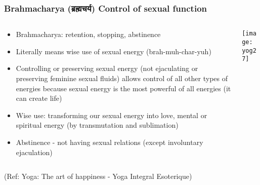 \begin{frame}[fragile]\frametitle{Brahmacharya (ब्रह्मचर्य) Control of sexual function  }
   \begin{columns}
    \begin{column}[t]{0.7\linewidth}
	
	\begin{itemize}
	\item Brahmacharya: retention, stopping, abstinence 
	\item Literally means wise use of sexual energy (brah-muh-char-yuh) 
	\item Controlling or preserving  sexual energy (not ejaculating or preserving feminine sexual fluids) allows control of all other types of energies because sexual energy is the most powerful of all energies (it can create life)
	\item Wise use: transforming our sexual energy into love, mental or spiritual energy (by transmutation and sublimation)
	\item Abstinence - not having sexual relations (except involuntary ejaculation) 


	\end{itemize}
	    \end{column}
    \begin{column}[t]{0.3\linewidth}
\begin{center}
\texttt{[image: yog27]}

\end{center}
    \end{column}
  \end{columns}
  
  \tiny{(Ref: Yoga: The art of happiness - Yoga Integral Esoterique)}

\end{frame}

